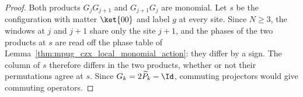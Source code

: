 \begin{proof}\leanok
    Both products $G_jG_{j+1}$ and $G_{j+1}G_j$ are monomial. Let $s$ be the
    configuration with matter $\ket{00}$ and label $g$ at every site. Since
    $N\geq3$, the windows at $j$ and $j+1$ share only the site $j+1$, and the
    phases of the two products at $s$ are read off the phase table of
    Lemma~\ref{thm:mpug_czx_local_monomial_action}: they differ by a sign.
    The column of $s$ therefore differs in the two products, whether or not
    their permutations agree at $s$. Since $G_k=2\widetilde P_k-\Id$,
    commuting projectors would give commuting operators.
\end{proof}
